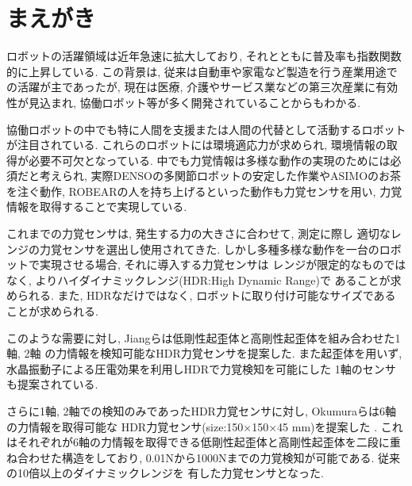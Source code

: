 \section{まえがき} 
ロボットの活躍領域は近年急速に拡大しており, 
それとともに普及率も指数関数的に上昇している. 
この背景は, 従来は自動車や家電など製造を行う産業用途での活躍が主であったが, 
現在は医療, 介護やサービス業などの第三次産業に有効性が見込まれ, 
協働ロボット等が多く開発されていることからもわかる.

協働ロボットの中でも特に人間を支援または人間の代替として活動するロボットが注目されている. 
これらのロボットには環境適応力が求められ, 環境情報の取得が必要不可欠となっている.
中でも力覚情報は多様な動作の実現のためには必須だと考えられ, 
実際DENSOの多関節ロボット\cite{denso}の安定した作業やASIMO\cite{asimo}のお茶を注ぐ動作, 
ROBEAR\cite{ROBEAR}の人を持ち上げるといった動作も力覚センサを用い, 
力覚情報を取得することで実現している.

これまでの力覚センサは, 発生する力の大きさに合わせて, 測定に際し
適切なレンジの力覚センサを選出し使用されてきた. 
しかし多種多様な動作を一台のロボットで実現させる場合, それに導入する力覚センサは
レンジが限定的なものではなく, よりハイダイナミックレンジ(HDR:High Dynamic Range)で
あることが求められる. 
また, HDRなだけではなく, ロボットに取り付け可能なサイズであることが求められる. 

このような需要に対し, Jiangらは低剛性起歪体と高剛性起歪体を組み合わせた1軸\cite{Jiang2015}, 2軸\cite{jiang2013}
の力情報を検知可能なHDR力覚センサを提案した. 
また起歪体を用いず, 水晶振動子による圧電効果を利用しHDRで力覚検知を可能にした
1軸のセンサも提案されている\cite{murozaki2014miniaturized}.

さらに1軸, 2軸での検知のみであったHDR力覚センサに対し, Okumuraらは6軸の力情報を取得可能な
HDR力覚センサ(size:150×150×45 mm)を提案した\cite{okumura2018high} \cite{Okumura}. 
これはそれぞれが6軸の力情報を取得できる低剛性起歪体と高剛性起歪体を二段に重ね合わせた構造をしており, 
0.01Nから1000Nまでの力覚検知が可能である. 従来の10倍以上のダイナミックレンジを
有した力覚センサとなった. 



